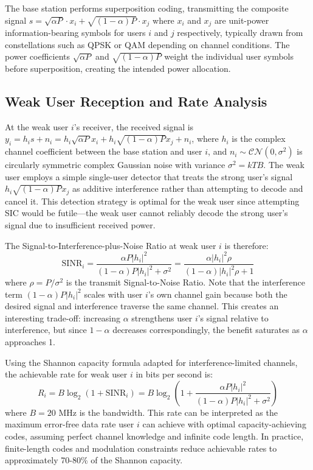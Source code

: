 The base station performs superposition coding, transmitting the composite signal $s = \sqrt{\alpha P} \cdot x_i + \sqrt{(1-\alpha) P} \cdot x_j$ where $x_i$ and $x_j$ are unit-power information-bearing symbols for users $i$ and $j$ respectively, typically drawn from constellations such as QPSK or QAM depending on channel conditions. The power coefficients $\sqrt{\alpha P}$ and $\sqrt{(1-\alpha) P}$ weight the individual user symbols before superposition, creating the intended power allocation.

\subsection{Weak User Reception and Rate Analysis}

At the weak user $i$'s receiver, the received signal is $y_i = h_i s + n_i = h_i \sqrt{\alpha P} x_i + h_i \sqrt{(1-\alpha) P} x_j + n_i$, where $h_i$ is the complex channel coefficient between the base station and user $i$, and $n_i \sim \mathcal{CN}(0, \sigma^2)$ is circularly symmetric complex Gaussian noise with variance $\sigma^2 = kTB$. The weak user employs a simple single-user detector that treats the strong user's signal $h_i \sqrt{(1-\alpha) P} x_j$ as additive interference rather than attempting to decode and cancel it. This detection strategy is optimal for the weak user since attempting SIC would be futile—the weak user cannot reliably decode the strong user's signal due to insufficient received power.

The Signal-to-Interference-plus-Noise Ratio at weak user $i$ is therefore:
\begin{equation}
\text{SINR}_i = \frac{\alpha P |h_i|^2}{(1-\alpha) P |h_i|^2 + \sigma^2} = \frac{\alpha |h_i|^2 \rho}{(1-\alpha) |h_i|^2 \rho + 1}
\end{equation}
where $\rho = P/\sigma^2$ is the transmit Signal-to-Noise Ratio. Note that the interference term $(1-\alpha) P |h_i|^2$ scales with user $i$'s own channel gain because both the desired signal and interference traverse the same channel. This creates an interesting trade-off: increasing $\alpha$ strengthens user $i$'s signal relative to interference, but since $1-\alpha$ decreases correspondingly, the benefit saturates as $\alpha$ approaches 1.

Using the Shannon capacity formula adapted for interference-limited channels, the achievable rate for weak user $i$ in bits per second is:
\begin{equation}
R_i = B \log_2(1 + \text{SINR}_i) = B \log_2\left(1 + \frac{\alpha P |h_i|^2}{(1-\alpha) P |h_i|^2 + \sigma^2}\right)
\end{equation}
where $B = 20$ MHz is the bandwidth. This rate can be interpreted as the maximum error-free data rate user $i$ can achieve with optimal capacity-achieving codes, assuming perfect channel knowledge and infinite code length. In practice, finite-length codes and modulation constraints reduce achievable rates to approximately 70-80\% of the Shannon capacity.

